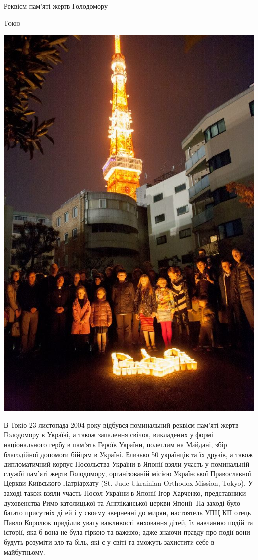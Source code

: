 \documentclass[10pt,a4paper]{article}
\newcommand{\NewsItem}[1]{%
		\usefont{T2A}{iwona}{m}{n} 
		\large #1 \vspace{4pt}
		\par \normalsize \normalfont}
\newcommand{\NewsAuthor}[1]{%
			\hfill \textsc{#1} \vspace{4pt}
			\par \normalfont}
\begin{document}
\begin{multicols}{3}

\NewsItem{Реквієм пам'яті жертв Голодомору}
\NewsAuthor{Токіо}
		\begin{center}
			\includegraphics[width=0.8\linewidth]{images/rekviem}
		\end{center}
В Токіо 23 листопада 2004 року відбувся поминальний реквієм пам'яті жертв Голодомору в Україні, а також запалення свічок, викладених у формі національного гербу в пам'ять Героїв України, полеглим на Майдані, збір благодійної допомоги бійцям в Україні.
Близько 50 українців та їх друзів, а також дипломатичний корпус Посольства України в Японії взяли участь у поминальній службі пам'яті жертв Голодомору, організованій місією Української Православної Церкви Київського Патріархату (St. Jude Ukrainian Orthodox Mission, Tokyo). У заході також взяли участь Посол України в Японії Ігор Харченко, представники духовенства Римо-католицької та Англіканської церкви Японії.
На заході було багато присутніх дітей і у своєму зверненні до мирян, настоятель УПЦ КП отець Павло Королюк приділив увагу важливості виховання дітей, їх навчанню подій та історії, яка б вона не була гіркою та важкою; адже знаючи правду про події вони будуть розуміти зло та біль, які є у світі та зможуть захистити себе в майбутньому.

\end{multicols}
\end{document}
